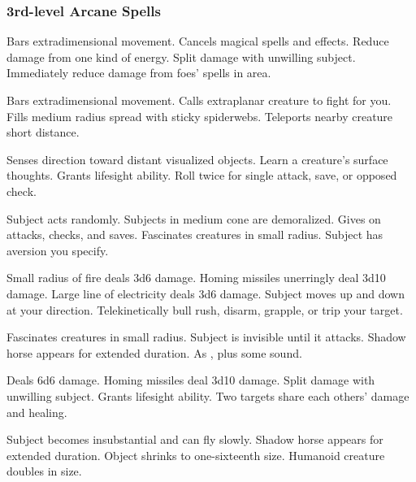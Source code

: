 \subsubsection{3rd-level Arcane Spells} 
\begin{swspelllist}
   Bars extradimensional movement.
   Cancels magical spells and effects.
   Reduce damage from one kind of energy.
   Split damage with unwilling subject.
   Immediately reduce damage from foes' spells in area.

   Bars extradimensional movement.
   Calls extraplanar creature to fight for you.
   Fills medium radius spread with sticky spiderwebs.
   Teleports nearby creature short distance.

   Senses direction toward distant visualized objects.
   Learn a creature's surface thoughts.
   Grants lifesight ability.
   Roll twice for single attack, save, or opposed check.

   Subject acts randomly.
   Subjects in medium cone are demoralized.
   Gives  on attacks, checks, and saves.
   Fascinates creatures in small radius.
   Subject has aversion you specify.

   Small radius of fire deals 3d6 damage.
   Homing missiles unerringly deal 3d10 damage.
   Large line of electricity deals 3d6 damage.
   Subject moves up and down at your direction.
   Telekinetically bull rush, disarm, grapple, or trip your target.

   Fascinates creatures in small radius.
   Subject is invisible until it attacks.
   Shadow horse appears for extended duration.
   As , plus some sound.

   Deals 6d6 damage.
   Homing missiles deal 3d10 damage.
   Split damage with unwilling subject.
   Grants lifesight ability.
   Two targets share each others' damage and healing.

   Subject becomes insubstantial and can fly slowly.
   Shadow horse appears for extended duration.
   Object shrinks to one-sixteenth size.
   Humanoid creature doubles in size.
\end{swspelllist}

